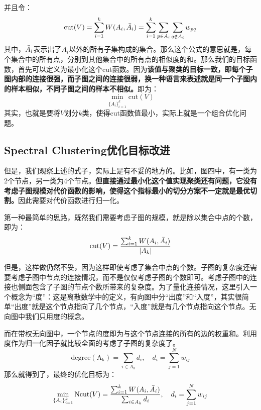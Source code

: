 \documentclass[a4paper]{article}
\begin{document}
并且令：
\begin{equation}
    \mathrm{cut}(V) = \sum_{i=1}^k W(A_i,\Bar{A}_i) = \sum_{i=1}^k \sum_{p\in A_i} \sum_{q\notin A_i} w_{pq}
\end{equation}
其中，$\Bar{A}_i$表示出了$A_i$以外的所有子集构成的集合。那么这个公式的意思就是，每个集合中的所有点，分别到其他集合中的所有点的相似度的和。那么我们的目标函数，首先可以定义为最小化这个cut函数。因为\textbf{该值与聚类的目标一致，即每个子图内部的连接很强，而子图之间的连接很弱，换一种语言来表述就是同一个子图内的样本相似，不同子图之间的样本不相似。}即为：
\begin{equation}
    \min_{\{A_i\}_{i=1}^k}\mathrm{cut}(V)
\end{equation}
其实，也就是要将$V$划分$k$类，使得$\mathrm{cut}$函数值最小，实际上就是一个组合优化问题。

\subsection{Spectral Clustering优化目标改进}
但是，我们观察上述的式子，实际上是有不妥的地方的。比如，图四中，有一类为2个节点，另一类为4个节点。\textbf{但直接通过最小化这个值实现聚类还有问题，它没有考虑子图规模对代价函数的影响，使得这个指标最小的切分方案不一定就是最优切割。}因此需要对代价函数进行归一化。

第一种最简单的思路，既然我们需要考虑子图的规模，就是除以集合中点的个数，即为：
\begin{equation}
    \mathrm{cut}(V) = \frac{\sum_{i=1}^k W(A_i,\Bar{A}_i)}{|A_k|}
\end{equation}

但是，这样做仍然不妥，因为这样即使考虑了集合中点的个数。子图的复杂度还需要考虑子图中节点的连接情况，而不是仅仅考虑子图的个数即可。考虑子图中的连接也侧面包含了子图的节点个数所带来的复杂度。为了量化连接情况，这里引入一个概念为“度”：这是离散数学中的定义，有向图中分“出度”和“入度”，其实很简单“出度”就是这个节点指向了几个节点，“入度”就是有几个节点指向这个节点。无向图中我们只用度的概念。

而在带权无向图中，一个节点的度即为与这个节点连接的所有的边的权重和。利用度作为归一化因子就比较全面的考虑了子图的复杂度了。
\begin{equation}
    \mathrm{degree(A_k)} = \sum_{i\in A_k} d_i,\quad d_i = \sum_{j=1}^N w_{ij}
\end{equation}
那么就得到了，最终的优化目标为：
\begin{equation}
    \min_{\{A_i\}_{i=1}^k} \mathrm{Ncut}(V) = \frac{\sum_{i=1}^k W(A_i,\Bar{A}_i)}{\sum_{i\in A_k} d_i} ,\quad d_i = \sum_{j=1}^N w_{ij}
\end{equation}
\end{document}
